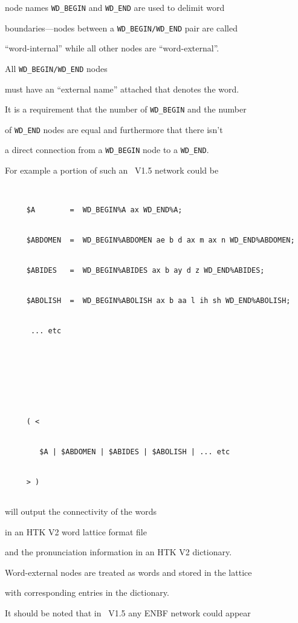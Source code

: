 node names \texttt{WD\_BEGIN} and \texttt{WD\_END} are used to delimit word 


boundaries---nodes between a \texttt{WD\_BEGIN/WD\_END} pair are called 


``word-internal'' while all other nodes are  ``word-external''.  


All \texttt{WD\_BEGIN/WD\_END} nodes 


must have an ``external name'' attached that denotes the word. 


It is a requirement that the number of \texttt{WD\_BEGIN} and the number


of \texttt{WD\_END} nodes are equal and furthermore that there isn't


a direct connection from a \texttt{WD\_BEGIN} node to a \texttt{WD\_END}.


For example a portion of such an \HTK\ V1.5  network could be 


\begin{verbatim}


     $A        =  WD_BEGIN%A ax WD_END%A;


     $ABDOMEN  =  WD_BEGIN%ABDOMEN ae b d ax m ax n WD_END%ABDOMEN;


     $ABIDES   =  WD_BEGIN%ABIDES ax b ay d z WD_END%ABIDES;


     $ABOLISH  =  WD_BEGIN%ABOLISH ax b aa l ih sh WD_END%ABOLISH;


      ... etc








     ( < 


        $A | $ABDOMEN | $ABIDES | $ABOLISH | ... etc


     > )


\end{verbatim}


 will output the connectivity of the words 


in an HTK V2 word lattice format file


and the pronunciation information in an HTK V2 dictionary.


Word-external nodes are treated as words and stored in the lattice


with corresponding entries in the dictionary. 





It should be noted that in \HTK\ V1.5 any ENBF network could appear



